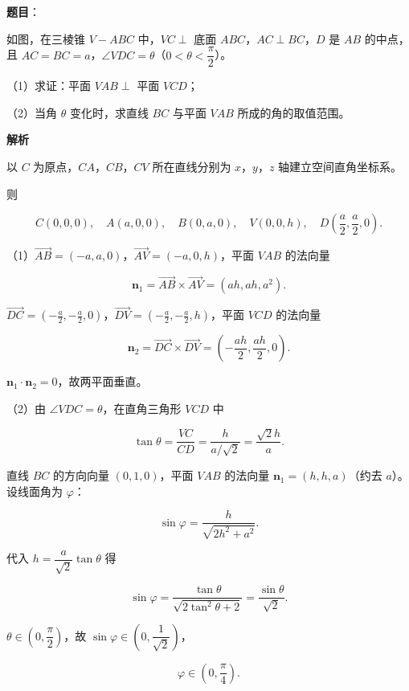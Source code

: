 \begin{answer}

\textbf{题目}：

如图，在三棱锥 $V-ABC$ 中，$VC\perp$ 底面 $ABC$，$AC\perp BC$，$D$ 是 $AB$ 的中点，且 $AC=BC=a$，$\angle VDC=\theta$（$0<\theta<\dfrac{\pi}2$）。

（1）求证：平面 $VAB\perp$ 平面 $VCD$；

（2）当角 $\theta$ 变化时，求直线 $BC$ 与平面 $VAB$ 所成的角的取值范围。
\nopagebreak[4]
\begin{center}\end{center}
\nopagebreak[4]
\textbf{解析}

以 $C$ 为原点，$CA$，$CB$，$CV$ 所在直线分别为 $x$，$y$，$z$ 轴建立空间直角坐标系。

则

\nopagebreak[4]
\[C(0,0,0),\quad A(a,0,0),\quad B(0,a,0),\quad V(0,0,h),\quad D\left(\frac a2,\frac a2,0\right).\]

（1）$\overrightarrow{AB}=(-a,a,0)$，$\overrightarrow{AV}=(-a,0,h)$，平面 $VAB$ 的法向量

\nopagebreak[4]
\[\boldsymbol n_1=\overrightarrow{AB}\times\overrightarrow{AV}=\left(ah,ah,a^2\right).\]

$\overrightarrow{DC}=\left(-\frac a2,-\frac a2,0\right)$，$\overrightarrow{DV}=\left(-\frac a2,-\frac a2,h\right)$，平面 $VCD$ 的法向量

\nopagebreak[4]
\[\boldsymbol n_2=\overrightarrow{DC}\times\overrightarrow{DV}=\left(-\frac{ah}2,\frac{ah}2,0\right).\]

$\boldsymbol n_1\cdot\boldsymbol n_2=0$，故两平面垂直。

（2）由 $\angle VDC=\theta$，在直角三角形 $VCD$ 中

\nopagebreak[4]
\[\tan\theta=\frac{VC}{CD}=\frac{h}{a/\sqrt2}=\frac{\sqrt2h}a.\]

直线 $BC$ 的方向向量 $(0,1,0)$，平面 $VAB$ 的法向量 $\boldsymbol n_1=(h,h,a)$（约去 $a$）。设线面角为 $\varphi$：

\nopagebreak[4]
\[\sin\varphi=\frac{h}{\sqrt{2h^2+a^2}}.\]

代入 $h=\dfrac a{\sqrt2}\tan\theta$ 得

\nopagebreak[4]
\[\sin\varphi=\frac{\tan\theta}{\sqrt{2\tan^2\theta+2}}=\frac{\sin\theta}{\sqrt2}.\]

$\theta\in\left(0,\dfrac{\pi}2\right)$，故 $\sin\varphi\in\left(0,\dfrac1{\sqrt2}\right)$，

\nopagebreak[4]
\[\varphi\in\left(0,\frac{\pi}4\right).\]


\end{answer}
